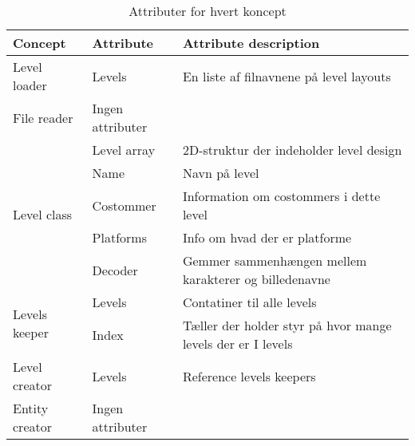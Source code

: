 \begin{table}[]
\centering
\begin{tabular}{|l|l|l|}
\hline
\textbf{Concept}               & \textbf{Attribute} & \textbf{Attribute description}                              \\ \hline
Level loader                   & Levels             & En liste af filnavnene på level layouts                     \\ \hline
File reader                    & Ingen attributer   &                                                             \\ \hline
\multirow{5}{*}{Level class}   & Level array        & 2D-struktur der indeholder level design                     \\ \cline{2-3}
                               & Name               & Navn på level                                               \\ \cline{2-3}
                               & Costommer          & Information om costommers i dette level                     \\ \cline{2-3}
                               & Platforms          & Info om hvad der er platforme                               \\ \cline{2-3}
                               & Decoder            & Gemmer sammenhængen mellem karakterer og billedenavne       \\ \hline
\multirow{2}{*}{Levels keeper} & Levels             & Contatiner til alle levels                                  \\ \cline{2-3}
                               & Index              & Tæller der holder styr på hvor mange levels der er I levels \\ \hline
Level creator                  & Levels             & Reference levels keepers                                    \\ \hline
Entity creator                 & Ingen attributer   &                                                             \\ \hline
\end{tabular}
\caption{Attributer for hvert koncept}
\label{attributes}
\end{table}
